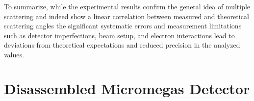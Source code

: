 \documentclass[sn-mathphys-num,iicol]{sn-jnl}
\theoremstyle{thmstyleone}
\theoremstyle{thmstyletwo}
\theoremstyle{thmstylethree}
\begin{document}
To summarize, while the experimental results confirm the general idea of multiple scattering and indeed show a linear correlation between measured 
and theoretical scattering angles the significant systematic errors and measurement limitations such as detector imperfections, beam setup, 
and electron interactions lead to deviations from theoretical expectations and reduced precision in the analyzed values. 

\clearpage\appendix\onecolumn


\section{Disassembled Micromegas Detector}
\renewcommand{\thefigure}{\Alph{section}\arabic{figure}}
\setcounter{figure}{0}
\renewcommand{\thetable}{\Alph{section}\arabic{table}}
\setcounter{table}{0}
\end{document}
